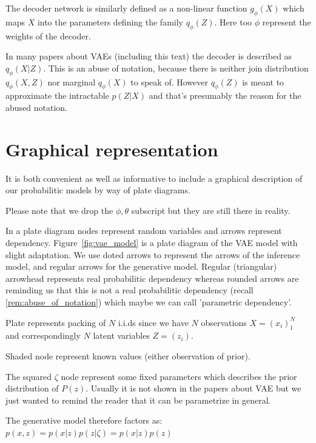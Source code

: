 \documentclass[11pt, a4paper]{report}
\theoremstyle{plain}
\theoremstyle{definition}
\theoremstyle{remark}
\begin{document}
The decoder network is similarly defined as a non-linear function $g_{\phi}(X)$ which
maps $X$ into the parameters defining the family $q_{\phi}(Z)$. Here too $\phi$
represent the weights of the decoder.

\remark{}\label{rem:abuse_of_notation}
In many papers about VAEs (including this text) the decoder is described as
$q_{\phi}(X | Z)$. This is an abuse of notation, because there is neither 
join distribution $q_{\phi}(X,Z)$ nor marginal $q_{\phi}(X)$ to speak of.
However $q_{\phi}(Z)$ is meant to approximate the intractable $p(Z|X)$ and
that's presumably the reason for the abused notation.


\section{Graphical representation}


It is both convenient as well as informative to include a graphical description
of our probabilitic models by way of plate diagrams.

Please note that we drop the $\phi, \theta$ subscript but they are still there
in reality.

In a plate diagram nodes represent random variables and arrows
represent dependency.
Figure~\ref{fig:vae_model} is a plate diagram of the VAE model with slight
adaptation. We use doted arrows to represent the arrows of the inference model,
and regular arrows for the generative model. Regular (triangular) arrowhead
represents real probabilitic dependency whereas rounded arrows are reminding us
that this is not a real probabilitic dependency (recall
\ref{rem:abuse_of_notation}) which maybe we can call 'parametric
dependency'.

Plate represents packing of $N$ i.i.ds since we have $N$ observations $X =
(x_i)_1^N$ and correspondingly $N$ latent variables $Z = (z_i)$.

Shaded node represent known values (either observation of prior).

The squared $\zeta$ node represent some fixed parameters which describes the
prior distribution of $P(z)$. Usually it is not shown in the papers about VAE
but we just wanted to remind the reader that it can be parametrize in general.

The generative model therefore factors as: $p(x,z) = p(x|z)p(z|\zeta) =
p(x|z)p(z)$
\end{document}

